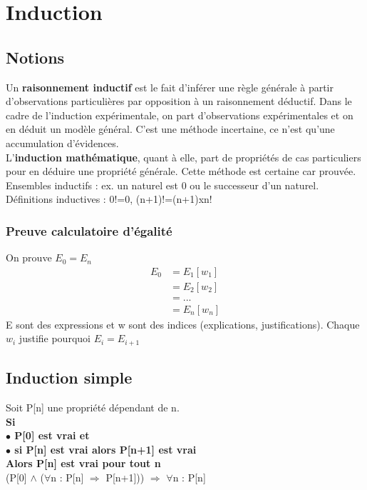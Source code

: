 \section{Induction}

\subsection{Notions}
Un \textbf{raisonnement inductif} est le fait d'inférer une règle générale à partir d'observations particulières par opposition à un raisonnement déductif. Dans le cadre de l'induction expérimentale, on part d'observations expérimentales et on en déduit un modèle général. C'est une méthode incertaine, ce n'est qu'une accumulation d'évidences.\\

L'\textbf{induction mathématique}, quant à elle, part de propriétés de cas particuliers pour en déduire une propriété générale. Cette méthode est certaine car prouvée.\\

Ensembles inductifs : ex. un naturel est 0 ou le successeur d'un naturel.\\

Définitions inductives : 0!=0, (n+1)!=(n+1)xn!

\subsubsection{Preuve calculatoire d'égalité}
On prouve $E_0=E_n$
\begin{align*}
	E_0 &= E_1 [w_1]\\
	&= E_2 [w_2]\\
	&= ...\\
	&= E_n [w_n]
\end{align*}
E sont des expressions et w sont des indices (explications, justifications). Chaque $w_i$ justifie pourquoi $E_i = E_{i+1}$
\subsection{Induction simple}
Soit P[n] une propriété dépendant de n.\\
\textbf{Si\\ $\bullet$ P[0] est vrai et \\ $\bullet$ si P[n] est vrai alors P[n+1] est vrai \\ Alors P[n] est vrai pour tout n}\\
(P[0] $\wedge$ ($\forall$n : P[n] $\Rightarrow$ P[n+1])) $\Rightarrow$ $\forall$n : P[n]\\

